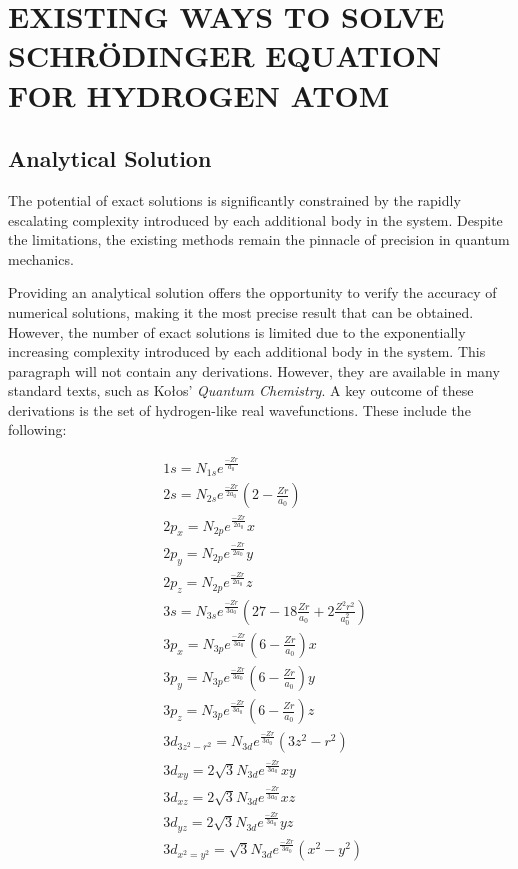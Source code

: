 \section{EXISTING WAYS TO SOLVE SCHRÖDINGER EQUATION FOR HYDROGEN ATOM}

\subsection{Analytical Solution}

The potential of exact solutions is significantly constrained by the rapidly escalating complexity introduced by each additional body in the system. 
Despite the limitations, the existing methods remain the pinnacle of precision in quantum mechanics.

Providing an analytical solution offers the opportunity to verify the accuracy of numerical solutions, making it the most precise result that can be obtained. However, the number of exact solutions is limited due to the exponentially increasing complexity introduced by each additional body in the system. This paragraph will not contain any derivations. However, they are available in many standard texts, such as Kołos' \textit{Quantum Chemistry}.
A key outcome of these derivations is the set of hydrogen-like real wavefunctions\cite{kolos1978}. These include the following:

\begin{equation}
	\begin{aligned}
		& 1s = N_{1s}e^{\frac{-Zr}{a_0}} \\
		& 2s = N_{2s}e^{\frac{-Zr}{2a_0}}(2 - \frac{Zr}{a_0}) \\
		& 2p_x =  N_{2p}e^{\frac{-Zr}{2a_0}}x \\
		& 2p_y =  N_{2p}e^{\frac{-Zr}{2a_0}}y \\
		& 2p_z =  N_{2p}e^{\frac{-Zr}{2a_0}}z \\		
		& 3s = N_{3s}e^{\frac{-Zr}{3a_0}}(27 - 18\frac{Zr}{a_0} + 2\frac{Z^2r^2}{a^2_0}) \\
		& 3p_x =  N_{3p}e^{\frac{-Zr}{3a_0}}(6-\frac{Zr}{a_0})x \\
		& 3p_y =  N_{3p}e^{\frac{-Zr}{3a_0}}(6-\frac{Zr}{a_0})y \\
		& 3p_z =  N_{3p}e^{\frac{-Zr}{3a_0}}(6-\frac{Zr}{a_0})z \\
		& 3d_{3z^2-r^2} =  N_{3d}e^{\frac{-Zr}{3a_0}}(3z^2-r^2) \\
		& 3d_{xy} =  2\sqrt{3}N_{3d}e^{\frac{-Zr}{3a_0}}xy \\
		& 3d_{xz} =  2\sqrt{3}N_{3d}e^{\frac{-Zr}{3a_0}}xz \\
		& 3d_{yz} =  2\sqrt{3}N_{3d}e^{\frac{-Zr}{3a_0}}yz \\
		& 3d_{x^2=y^2} =  \sqrt{3}N_{3d}e^{\frac{-Zr}{3a_0}}(x^2-y^2) \\
	\end{aligned}
\end{equation}

